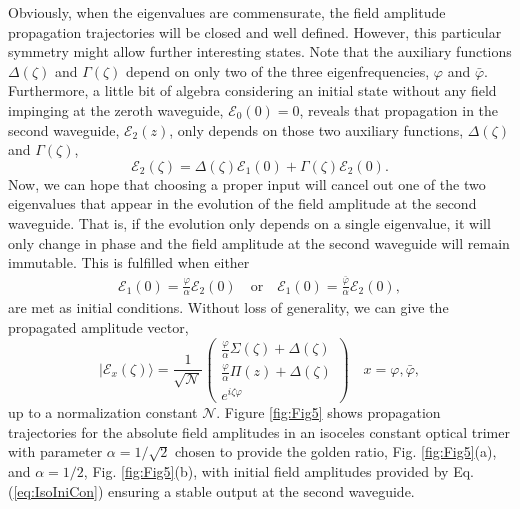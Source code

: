 \documentclass[9pt,twocolumn,twoside]{osajnl}
\begin{document}
Obviously, when the eigenvalues are commensurate, the field amplitude propagation trajectories will be closed and well defined. 
However, this particular symmetry might allow further interesting states.
Note that the auxiliary functions $\Delta(\zeta)$ and $\Gamma(\zeta)$ depend on only two of the three eigenfrequencies, $\varphi$ and $\bar{\varphi}$. 
Furthermore, a little bit of algebra considering an initial state without any field impinging at the zeroth waveguide, $\mathcal{E}_{0}(0)=0$, reveals that propagation in the second waveguide, $\mathcal{E}_{2}(z)$, only depends on those two auxiliary functions, $\Delta(\zeta)$ and $\Gamma(\zeta)$,
\begin{equation}
\mathcal{E}_{2}(\zeta) = \Delta(\zeta)\mathcal{E}_{1}(0)
+\Gamma(\zeta)\mathcal{E}_{2}(0).
\end{equation}
Now, we can hope that choosing a proper input will cancel out one of the two 
eigenvalues that appear in the evolution of the field amplitude at the second waveguide.
That is, if the evolution only depends on a single eigenvalue, it will only change in phase and the field amplitude at the second waveguide will remain immutable. 
This is fulfilled when either 
\begin{eqnarray}
\mathcal{E}_{1}(0)= \frac{\varphi}{\alpha} \mathcal{E}_{2}(0)\quad \mathrm{or} \quad
\mathcal{E}_{1}(0)= \frac{\bar{\varphi}}{\alpha} \mathcal{E}_{2}(0), \label{eq:IsoIniCon}
\end{eqnarray}
are met as initial conditions.
Without loss of generality, we can give the propagated amplitude vector,
\begin{equation} \label{eq:StatAmp}
\vert \mathcal{E}_{x}(\zeta) \rangle = \frac{1}{\sqrt{\mathcal{N}}}\left( \begin{array}{c}
\frac{\varphi}{\alpha} \Sigma(\zeta) + \Delta(\zeta) \\
\frac{\varphi}{\alpha} \Pi(z) + \Delta(\zeta) \\
e^{i\zeta\varphi}
\end{array} \right)	\quad x= \varphi, \bar{\varphi},
\end{equation}
up to a normalization constant $\mathcal{N}$.
Figure \ref{fig:Fig5} shows propagation trajectories for the absolute field amplitudes in an isoceles constant optical trimer with parameter $\alpha = 1 /\sqrt{2}$ chosen to provide the golden ratio, Fig. \ref{fig:Fig5}(a), and  $\alpha = 1/ 2$, Fig. \ref{fig:Fig5}(b), with initial field amplitudes provided by Eq.(\ref{eq:IsoIniCon}) ensuring a stable output at the second waveguide.
\end{document}
